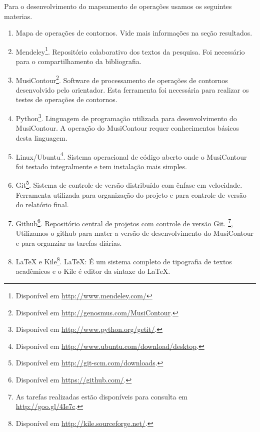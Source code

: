 \documentclass[11pt]{article}
\begin{document}
\label{sec:materiais}

Para o desenvolvimento do mapeamento de operações usamos os seguintes
materias.

\begin{enumerate}
\item Mapa de operações de contornos. Vide mais
  informações na seção resultados.
\item Mendeley\footnote{Disponível em
    \url{http://www.mendeley.com/}}. Repositório colaborativo dos
  textos da pesquisa. Foi necessário para o
  compartilhamento da bibliografia.
\item MusiContour\footnote{Disponível em
    \url{http://genosmus.com/MusiContour}.}. Software de processamento
  de operações de contornos desenvolvido pelo orientador. Esta
  ferramenta foi necessária para realizar os testes de operações de
  contornos.
\item Python\footnote{Disponível em
    \url{http://www.python.org/getit/}.}. Linguagem de programação
  utilizada para desenvolvimento do MusiContour. A operação do
  MusiContour requer conhecimentos básicos desta linguagem.
\item Linux/Ubuntu\footnote{Disponível em
  \url{http://www.ubuntu.com/download/desktop}.}. Sistema operacional
  de código aberto onde o MusiContour foi testado integralmente e
  tem instalação mais simples.
\item Git\footnote{Disponível em
    \url{http://git-scm.com/downloads}.}. Sistema de controle de
  versão distribuído com ênfase em velocidade. Ferramenta utilizada
  para organização do projeto e para controle de versão do relatório
  final.
\item Github\footnote{Disponível em
    \url{https://github.com/}.}. Repositório central de projetos com
  controle de versão Git.
\footnote{As tarefas realizadas estão
    disponíveis para consulta em \url{http://goo.gl/4Ie7c}.}, Utilizamos o
  github para mater a versão de desenvolvimento do MusiContour e para
  organziar as tarefas diárias.
\item \LaTeX{} e Kile\footnote{Disponível em
  \url{http://kile.sourceforge.net/}.}. \LaTeX: É um sistema completo de tipografia
  de textos acadêmicos e o Kile é editor da sintaxe do \LaTeX.
\end{enumerate}
\end{document}
